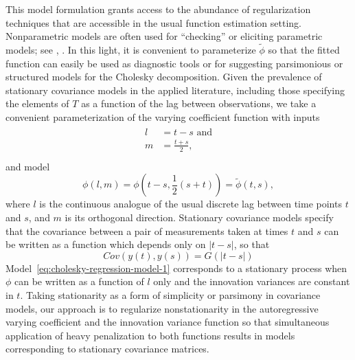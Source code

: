 \bigskip

This model formulation grants access to the abundance of regularization techniques that are accessible in the usual function estimation setting. Nonparametric models are often used for ``checking'' or eliciting parametric models; see \cite{cox1988testing}, \cite{liu2004hypothesis}. In this light, it is convenient to parameterize $\tilde{\phi}$ so that the fitted function can easily be used as diagnostic tools or for suggesting parsimonious or structured models for the Cholesky decomposition. Given the prevalence of stationary covariance models in the applied literature, including those specifying the elements of $T$ as a function of the lag between observations, we take a convenient parameterization of the varying coefficient function with inputs
\begin{align} 
\begin{split}\label{eq:l-m-transformation}
l &= t - s \mbox{ and}\\
m &= \frac{t + s}{2}, \\
\end{split}
\end{align}
\noindent
and model 
\begin{equation} \label{eq:} 
\phi\left(l,m\right) = \phi\left(t-s, \frac{1}{2}\left(s+t\right)\right) = \tilde{\phi}\left(t,s\right),
\end{equation}
\noindent
where $l$ is the continuous analogue of the usual discrete lag between time points $t$ and $s$, and $m$ is its orthogonal direction. Stationary covariance models specify that the covariance between a pair of measurements taken at times $t$ and $s$ can be written as a function which depends only on $\vert t - s\vert $, so that
\begin{equation*}
Cov\left(y\left( t \right),y\left( s \right)\right) = G\left( \vert t - s\vert  \right)
\end{equation*}
\noindent
Model~\eqref{eq:cholesky-regression-model-1} corresponds to a stationary process when $\phi$ can be written as a function of $l$ only and the innovation variances are constant in $t$. Taking stationarity as a form of simplicity or parsimony in covariance models, our approach is to regularize nonstationarity in the autoregressive varying coefficient and the innovation variance function so that simultaneous application of heavy penalization to both functions results in models corresponding to stationary covariance matrices.%



